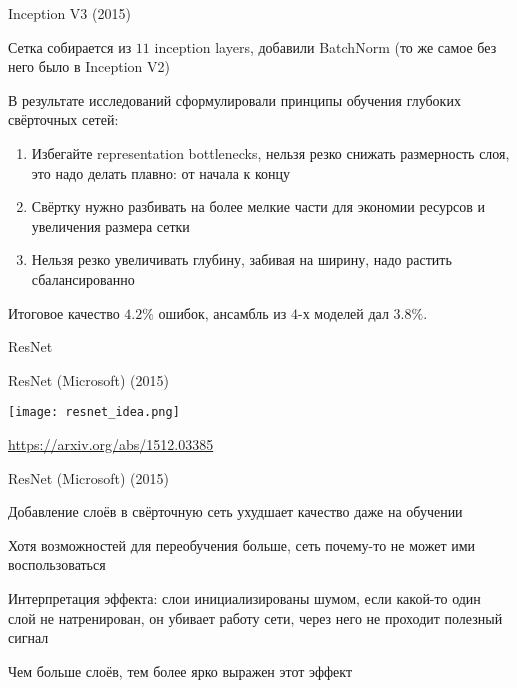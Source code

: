 \documentclass[notes,12pt, aspectratio=169]{beamer}
\newenvironment{transitionframe}{
  \setbeamercolor{background canvas}{bg=yellow}
  \begin{frame}}{
    \end{frame}
}
\newenvironment{wideitemize}{\itemize\addtolength{\itemsep}{10pt}}{\enditemize}
\begin{document}
\begin{frame}{Inception V3 (2015)}
\begin{wideitemize}
	\item  Сетка собирается из $11$ inception layers, добавили BatchNorm (то же самое без него было в Inception V2)
	
	\item В результате исследований сформулировали \alert{принципы обучения глубоких свёрточных сетей:}
	
	\begin{enumerate}
		\item  Избегайте representation bottlenecks, нельзя резко снижать размерность слоя, это надо делать плавно: от начала к концу
		\item Свёртку нужно разбивать на более мелкие части для экономии ресурсов и увеличения размера сетки 
		\item Нельзя резко увеличивать глубину, забивая на ширину, надо растить сбалансированно
	\end{enumerate} 

	\item Итоговое качество $4.2\%$ ошибок, ансамбль из $4$-х моделей дал $3.8\%$. 
\end{wideitemize}
\end{frame}


 \begin{transitionframe}
	\begin{center}
		\Huge  ResNet
	\end{center}
\end{transitionframe}


\begin{frame}{ResNet (Microsoft) (2015)}
\begin{center}
	\texttt{[image: resnet\_idea.png]}
\end{center}
\vfill %
\footnotesize
\color{blue} \url{https://arxiv.org/abs/1512.03385}
\end{frame}


\begin{frame}{ResNet (Microsoft) (2015)}
\begin{wideitemize}
	\item  Добавление слоёв в свёрточную сеть ухудшает качество даже на обучении
	\item  Хотя возможностей для переобучения больше, сеть почему-то не может ими воспользоваться
	\item  \alert{Интерпретация эффекта:} слои инициализированы шумом, если какой-то один слой не натренирован, он убивает работу сети, через него не проходит полезный сигнал 
	\item Чем больше слоёв, тем более ярко выражен этот эффект 
\end{wideitemize}
\end{frame}
\end{document}
